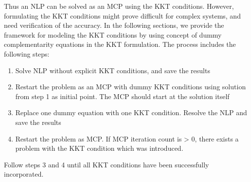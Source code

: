 \documentclass{article}
\begin{document}
\begin{comment}

\begin{equation}
\begin{aligned}
& \bigtriangledown{f(\hat{x})} - \sum_{i=1}^{m} u_{i} \bigtriangledown{g_{i}(\hat{x})}
			- \sum_{k=1}^{p} v_{i} \bigtriangledown{h_{k}(\hat{x})} - \sum_{l=1}^{q} w_{i} \bigtriangledown{d_{l}(\hat{x})} = 0  \\
\\
& h_{k}(\hat{x}) = 0   k = 1,2...p  \\
g_{i}(\hat{x}) \leq 0&	 i = 1,2...m \\  d_{l}(\hat{x}) \geq =0	&	l = 1,2...q
\\
and,\\
<u_{i},g_{i}(x)> = 0 \\ <v_{i},h_{k}(x)> =0 \\  <w_{l},d_{l}(x)> =0
\end{aligned}
\end{equation}

where $<u_{i},g_{i}(x)> = 0$  represent the complimentarily condition and variables u, v, and w represent the marginals of the respective constraint. It is often written as

 $g_{i}(x) \perp L \leq u \leq U $

where symbol $\perp $(referred to as perpendicular  to) indicates pair-wise complementarity between the function g() and variable u and its bounds. The complimentairy condition essentially

\end{comment}

Thus an NLP can be solved as an MCP using the KKT conditions. However, formulating the KKT conditions might prove difficult for complex systems, and need verification of the accuracy. In the following sections, we provide the framework for modeling the KKT conditions  by using concept of dummy complementarity equations in the KKT formulation. The process includes the following steps:

\begin{enumerate}
	\item Solve NLP without explicit KKT conditions, and save the results
	\item	 Restart the problem as an MCP with dummy KKT conditions using solution from step 1 as initial point. The MCP should start at the solution itself
	\item Replace one dummy equation with one KKT condition. Resolve the NLP and save the results
	\item Restart the problem as MCP. If MCP iteration count is > 0, there exists a problem with the KKT condition which was introduced.
\end{enumerate}
\noindent Follow steps 3 and 4 until all KKT conditions have been successfully incorporated.
\end{document}
